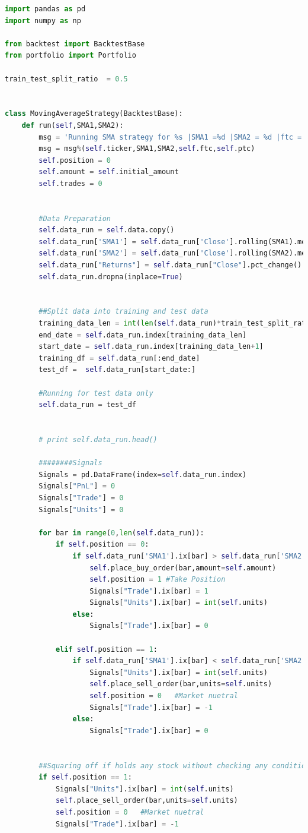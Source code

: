 \documentclass{report}
\begin{document}
\begin{lstlisting}[language=Python]
import pandas as pd
import numpy as np

from backtest import BacktestBase
from portfolio import Portfolio

train_test_split_ratio  = 0.5


class MovingAverageStrategy(BacktestBase):
	def run(self,SMA1,SMA2):
		msg = 'Running SMA strategy for %s |SMA1 =%d |SMA2 = %d |ftc = %f|ptc = %f'
		msg = msg%(self.ticker,SMA1,SMA2,self.ftc,self.ptc)
		self.position = 0
		self.amount = self.initial_amount
		self.trades = 0


		#Data Preparation
		self.data_run = self.data.copy()
		self.data_run['SMA1'] = self.data_run['Close'].rolling(SMA1).mean()
		self.data_run['SMA2'] = self.data_run['Close'].rolling(SMA2).mean()
		self.data_run["Returns"] = self.data_run["Close"].pct_change() 
		self.data_run.dropna(inplace=True)


		##Split data into training and test data
		training_data_len = int(len(self.data_run)*train_test_split_ratio) ##TO get training data
		end_date = self.data_run.index[training_data_len]
		start_date = self.data_run.index[training_data_len+1]
		training_df = self.data_run[:end_date]
		test_df =  self.data_run[start_date:]

		#Running for test data only
		self.data_run = test_df
		

		# print self.data_run.head()

		########Signals
		Signals = pd.DataFrame(index=self.data_run.index)
		Signals["PnL"] = 0
		Signals["Trade"] = 0
		Signals["Units"] = 0
				
		for bar in range(0,len(self.data_run)):
			if self.position == 0:
				if self.data_run['SMA1'].ix[bar] > self.data_run['SMA2'].ix[bar]:
					self.place_buy_order(bar,amount=self.amount) 
					self.position = 1 #Take Position
					Signals["Trade"].ix[bar] = 1
					Signals["Units"].ix[bar] = int(self.units)
				else:
					Signals["Trade"].ix[bar] = 0
					
			elif self.position == 1:
				if self.data_run['SMA1'].ix[bar] < self.data_run['SMA2'].ix[bar]:
					Signals["Units"].ix[bar] = int(self.units)
					self.place_sell_order(bar,units=self.units)
					self.position = 0   #Market nuetral
					Signals["Trade"].ix[bar] = -1
				else:
					Signals["Trade"].ix[bar] = 0
				
		
		##Squaring off if holds any stock without checking any condition
		if self.position == 1:
			Signals["Units"].ix[bar] = int(self.units)
			self.place_sell_order(bar,units=self.units)
			self.position = 0   #Market nuetral
			Signals["Trade"].ix[bar] = -1



\end{lstlisting}
\end{document}
